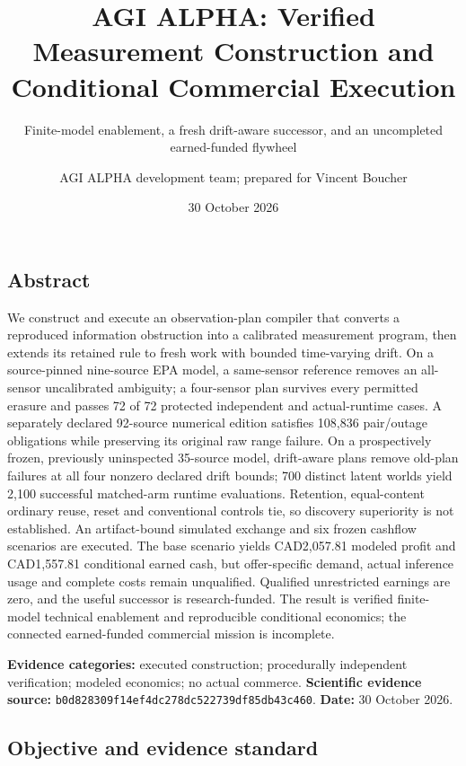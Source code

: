 \documentclass[
  11pt,
]{article}
\title{AGI ALPHA: Verified Measurement Construction and Conditional
Commercial Execution}
\subtitle{Finite-model enablement, a fresh drift-aware successor, and an
uncompleted earned-funded flywheel}
\author{AGI ALPHA development team; prepared for Vincent Boucher}
\date{30 October 2026}
\begin{document}
\maketitle

{
\hypersetup{linkcolor=}
\setcounter{tocdepth}{2}
\tableofcontents
}
\hypertarget{abstract}{%
\subsection{Abstract}\label{abstract}}

We construct and execute an observation-plan compiler that converts a
reproduced information obstruction into a calibrated measurement
program, then extends its retained rule to fresh work with bounded
time-varying drift. On a source-pinned nine-source EPA model, a
same-sensor reference removes an all-sensor uncalibrated ambiguity; a
four-sensor plan survives every permitted erasure and passes 72 of 72
protected independent and actual-runtime cases. A separately declared
92-source numerical edition satisfies 108,836 pair/outage obligations
while preserving its original raw range failure. On a prospectively
frozen, previously uninspected 35-source model, drift-aware plans remove
old-plan failures at all four nonzero declared drift bounds; 700
distinct latent worlds yield 2,100 successful matched-arm runtime
evaluations. Retention, equal-content ordinary reuse, reset and
conventional controls tie, so discovery superiority is not established.
An artifact-bound simulated exchange and six frozen cashflow scenarios
are executed. The base scenario yields CAD2,057.81 modeled profit and
CAD1,557.81 conditional earned cash, but offer-specific demand, actual
inference usage and complete costs remain unqualified. Qualified
unrestricted earnings are zero, and the useful successor is
research-funded. The result is verified finite-model technical
enablement and reproducible conditional economics; the connected
earned-funded commercial mission is incomplete.

\textbf{Evidence categories:} executed construction; procedurally
independent verification; modeled economics; no actual commerce.
\textbf{Scientific evidence source:}
\nolinkurl{b0d828309f14ef4dc278dc522739df85db43c460}. \textbf{Date:} 30
October 2026.

\hypertarget{objective-and-evidence-standard}{%
\subsection{Objective and evidence
standard}\label{objective-and-evidence-standard}}
\end{document}
